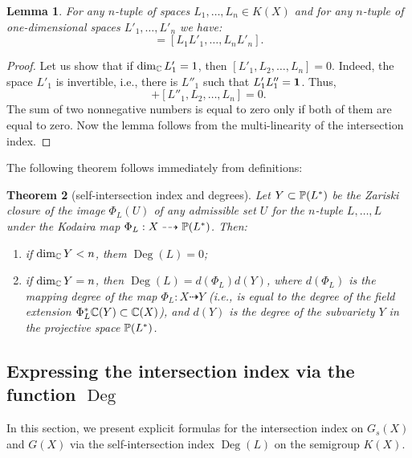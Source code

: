 \documentclass[11pt]{article}
\theoremstyle{plain}
\newtheorem{theorem}{Theorem}[section]
\newtheorem{lemma}[theorem]{Lemma}
\theoremstyle{definition}
\newcommand\D{\operatorname{Deg}}
\begin{document}
\begin{lemma}  For any $n$-tuple of spaces  $L_1,\dots, L_n\in K(X)$ and for any $n$-tuple of one-dimensional spaces  $L'_1,\dots, L'_n$ we have:
\begin{equation*}[L_1, \dots, L_n]=[L_1 L'_1,\dots, L_nL'_n].\end{equation*}
\end{lemma}

\begin{proof} Let us show that if $\dim_{\Bbb C}L'_1=1$, then $[L'_1, L_2,\dots, L_n]=0$. Indeed, the space $L'_1$ is invertible, i.e., there is $L''_1$ such that $L'_1L''_1=\bold 1$. Thus, \begin{equation*}[L'_1, L_2,\dots, L_n] +[L''_1, L_2,\dots, L_n]=0.\end{equation*} The sum of two nonnegative numbers is equal to zero only if both of them are equal to zero.
Now the lemma follows from the multi-linearity of the intersection index.
\end{proof}

The following theorem follows immediately from definitions:

\begin{theorem}[self-intersection index  and degrees]\label{selfspace} Let $Y\subset \Bbb P(L^*)$ be the Zariski closure of the image $\Phi_L(U)$  of any admissible set  $U$  for the $n$-tuple $L,\dots,L$  under the Kodaira map $\Phi_L:X\dashrightarrow \Bbb P(L^*)$. Then:
\begin{enumerate}\item if $\dim_{\Bbb C}Y<n$, them $\D(L)=0$;
\item if $\dim_{\Bbb C}Y=n$, then $\D(L)=d(\Phi_L)d(Y)$, where $d(\Phi _L)$ is the mapping degree of the map $\Phi_L:X\dashrightarrow Y$ (i.e., is equal to
the degree of the field extension $\Phi_L^*\Bbb C(Y)\subset \Bbb C(X)$), and $d(Y)$ is the degree of the subvariety $Y$ in the projective space $\Bbb P(L^*)$.
    \end{enumerate}
\end{theorem}


\subsection{Expressing the intersection index via the function $\D$}

In this section, we   present explicit formulas for the intersection index on $G_s(X)$ and $G(X)$ via
the self-intersection index $\D(L)$ on the semigroup
$K(X)$.
\end{document}
